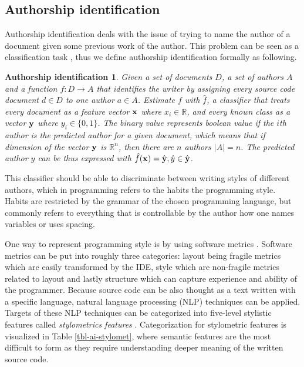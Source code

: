 \subsection{Authorship identification} \label{chap-ai}

Authorship identification deals with the issue of trying to name the author of a document given some previous work of the author. This problem can be seen as a classification task \cite{KRSUL1997233}, thus we define authorship identification formally as following.

\newtheorem*{aui1}{Authorship identification}
\begin{aui1}
Given a set of documents $D$, a set of authors $A$ and a function $f: D \rightarrow A$ that identifies the writer by assigning every source code document $d \in D$ to one author $a \in A$. Estimate $f$ with $\hat{f}$, a classifier that treats every document as a feature vector $\mathbf{x}$ where $x_i \in \mathbb{R}$, and every known class as a vector $\mathbf{y}$ where $y_i \in \{0, 1\}$. The binary value represents boolean value if the $i$th author is the predicted author for a given document, which means that if dimension of the vector $\mathbf{y}$ is $\mathbb{R}^n$, then there are $n$ authors $|A| = n$. The predicted author $\hat{y}$ can be thus expressed with $\hat{f}(\mathbf{x}) = \hat{\mathbf{y}}, \hat{y} \in \hat{\mathbf{y}}$.
\end{aui1}

This classifier should be able to discriminate between writing styles of different authors, which in programming refers to the habits \ie the programming style. Habits are restricted by the grammar of the chosen programming language, but commonly refers to everything that is controllable by the author \eg how one names variables or uses spacing.  

One way to represent programming style is by using software metrics \cite{KRSUL1997233}. Software metrics can be put into roughly three categories: layout being fragile metrics which are easily transformed by the IDE, style which are non-fragile metrics related to layout and lastly structure which can capture experience and ability of the programmer. Because source code can be also thought as a text written with a specific language, natural language processing (NLP) techniques can be applied. Targets of these NLP techniques can be categorized into five-level stylistic features called \emph{stylometrics features}  \cite{Stamatatos:2009:SMA:1527090.1527102}. Categorization for stylometric features is visualized in Table \ref{tbl-ai-stylomet}, where semantic features are the most difficult to form as they require understanding deeper meaning of the written source code.


